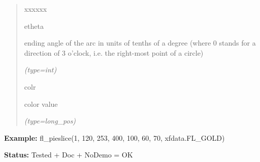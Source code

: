 \begin{boxedminipage}{\funcwidth}
\begin{quote}
\begin{Ventry}{xxxxxx}
          \item[etheta]

          ending angle of the arc in units of tenths of a degree (where 0 
          stands for a direction of 3 o'clock, i.e. the right-most point of
          a circle)

            {\it (type=int)}

          \item[colr]

          color value

            {\it (type=long\_pos)}

        \end{Ventry}

      \end{quote}

\textbf{Example:} fl\_pieslice(1, 120, 253, 400, 100, 60, 70, xfdata.FL\_GOLD)



\textbf{Status:} Tested + Doc + NoDemo = OK



    \end{boxedminipage}

    \label{xformslib:flxbasic:fl_arcf}

    \vspace{0.5ex}

